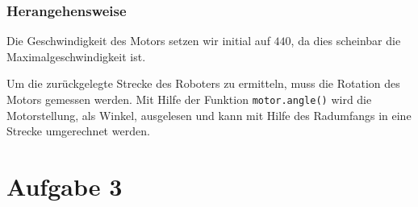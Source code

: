 \documentclass[ngerman]{tudscrreprt}
\newcommand{\code}[1]{\texttt{#1}}
\begin{document}
\subsection{Herangehensweise}
Die Geschwindigkeit des Motors setzen wir initial auf $440$, da dies scheinbar die Maximalgeschwindigkeit ist.

Um die zurückgelegte Strecke des Roboters zu ermitteln, muss die Rotation des Motors gemessen werden.
Mit Hilfe der Funktion \code{motor.angle()} wird die Motorstellung, als Winkel, ausgelesen und kann
mit Hilfe des Radumfangs in eine Strecke umgerechnet werden.

\chapter{Aufgabe 3}



\end{document}
